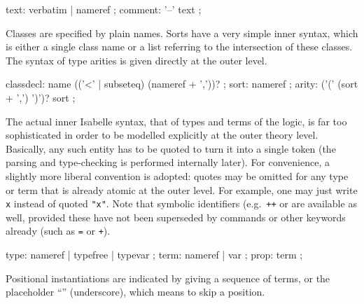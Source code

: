 \begin{isabellebody}
\begin{isamarkuptext}
  \begin{rail}
    text: verbatim | nameref
    ;
    comment: '--' text
    ;
  \end{rail}%
\end{isamarkuptext}%
\isamarkuptrue%
%
\isamarkuptrue%
%
\begin{isamarkuptext}%
Classes are specified by plain names.  Sorts have a very simple
  inner syntax, which is either a single class name  or a
  list  referring to the
  intersection of these classes.  The syntax of type arities is given
  directly at the outer level.

  \begin{rail}
    classdecl: name (('<' | subseteq) (nameref + ','))?
    ;
    sort: nameref
    ;
    arity: ('(' (sort + ',') ')')? sort
    ;
  \end{rail}%
\end{isamarkuptext}%
\isamarkuptrue%
%
\isamarkuptrue%
%
\begin{isamarkuptext}%
The actual inner Isabelle syntax, that of types and terms of the
  logic, is far too sophisticated in order to be modelled explicitly
  at the outer theory level.  Basically, any such entity has to be
  quoted to turn it into a single token (the parsing and type-checking
  is performed internally later).  For convenience, a slightly more
  liberal convention is adopted: quotes may be omitted for any type or
  term that is already atomic at the outer level.  For example, one
  may just write \verb|x| instead of quoted \verb|"x"|.
  Note that symbolic identifiers (e.g.\ \verb|++| or \isa{{\isasymforall}} are available as well, provided these have not been superseded
  by commands or other keywords already (such as \verb|=| or
  \verb|+|).

  \begin{rail}
    type: nameref | typefree | typevar
    ;
    term: nameref | var
    ;
    prop: term
    ;
  \end{rail}

  Positional instantiations are indicated by giving a sequence of
  terms, or the placeholder ``\isa{{\isacharunderscore}}'' (underscore), which means to
  skip a position.


\end{isamarkuptext}
\end{isabellebody}
